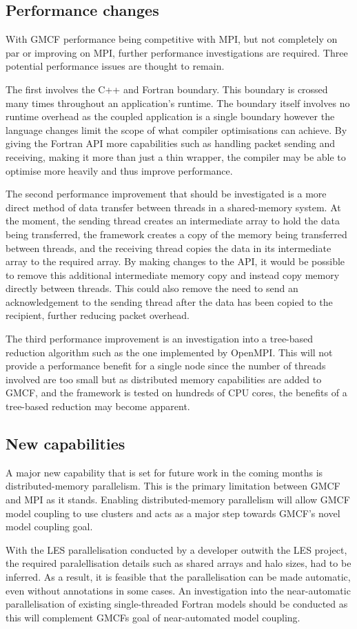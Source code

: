 \subsection{Performance changes}

With GMCF performance being competitive with MPI, but not completely on par or
improving on MPI, further performance investigations are required. Three
potential performance issues are thought to remain.

The first involves the C++ and Fortran boundary. This boundary is crossed many
times throughout an application's runtime. The boundary itself involves no
runtime overhead as the coupled application is a single boundary however the
language changes limit the scope of what compiler optimisations can achieve. By
giving the Fortran API more capabilities such as handling packet sending and
receiving, making it more than just a thin wrapper, the compiler may be able to
optimise more heavily and thus improve performance.

The second performance improvement that should be investigated is a more direct
method of data transfer between threads in a shared-memory system. At the
moment, the sending thread creates an intermediate array to hold the data being
transferred, the framework creates a copy of the memory being transferred
between threads, and the receiving thread copies the data in its intermediate
array to the required array. By making changes to the API, it would be possible
to remove this additional intermediate memory copy and instead copy memory
directly between threads. This could also remove the need to send an
acknowledgement to the sending thread after the data has been copied to the
recipient, further reducing packet overhead.

The third performance improvement is an investigation into a tree-based
reduction algorithm such as the one implemented by OpenMPI. This will not
provide a performance benefit for a single node since the number of threads
involved are too small but as distributed memory capabilities are added to GMCF,
and the framework is tested on hundreds of CPU cores, the benefits of a
tree-based reduction may become apparent.

\subsection{New capabilities}

A major new capability that is set for future work in the coming months is
distributed-memory parallelism. This is the primary limitation between GMCF and
MPI as it stands. Enabling distributed-memory parallelism will allow GMCF model
coupling to use clusters and acts as a major step towards GMCF's novel model
coupling goal.

With the LES parallelisation conducted by a developer outwith the LES project,
the required paralellisation details such as shared arrays and halo sizes, had
to be inferred. As a result, it is feasible that the parallelisation can be made
automatic, even without annotations in some cases. An investigation into the
near-automatic parallelisation of existing single-threaded Fortran models should
be conducted as this will complement GMCFs goal of near-automated model
coupling.
